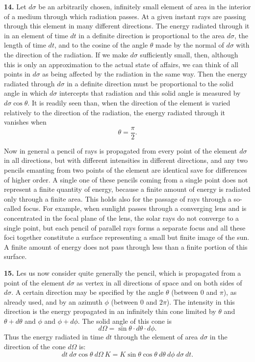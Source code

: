\documentclass[12pt,oneside]{book}
\begin{document}
\textbf{14.} Let $d\sigma$ be an arbitrarily chosen, infinitely small element of area in the interior of a medium through which radiation passes. At a given instant rays are passing through this element in many different directions. The energy radiated through it in an element of time $dt$ in a definite direction is proportional to the area $d\sigma$, the length of time $dt$, and to the cosine of the angle $\theta$ made by the normal of $d\sigma$ with the direction of the radiation. If we make $d\sigma$ sufficiently small, then, although this is only an approximation to the actual state of affairs, we can think of all points in $d\sigma$ as being affected by the radiation in the same way. Then the energy radiated through $d\sigma$ in a definite direction must be proportional to the solid angle in which $d\sigma$ intercepts that radiation and this solid angle is measured by $d\sigma \cos \theta$. It is readily seen than, when the direction of the element is varied relatively to the direction of the radiation, the energy radiated through it vanishes when 
$$\theta=\frac{\pi}{2}.$$ \par 

Now in general a pencil of rays is propagated from every point of the element $d\sigma$ in all directions, but with different intensities in different directions, and any two pencils emanting from two points of the element are identical save for differences of higher order. A single one of these pencils coming from a single point does not represent a finite quantity of energy, because a finite amount of energy is radiated only through a finite area. This holds also for the passage of rays through a so-called focus. For example, when sunlight passes through a converging lens and is concentrated in the focal plane of the lens, the solar rays do not converge to a single point, but each pencil of parallel rays forms a separate focus and all these foci together constitute a surface representing a small but finite image of the sun. A finite amount of energy does not pass through less than a finite portion of this surface. \par 

\textbf{15.} Les us now consider quite generally the pencil, which is propagated from a point of the element $d\sigma$ as vertex in all directions of space and on both sides of $d\sigma$. A certain direction may be specified by the angle $\theta$ (between 0 and $\pi$), as already used, and by an azimuth $\phi$ (between 0 and $2\pi$). The intensity in this direction is the energy propagated in an infinitely thin cone limited by $\theta$ and $\theta+d\theta$ and $\phi$ and $\phi+d\phi$. The solid angle of this cone is 
\begin{equation}
    \label{eq5}
    d\Omega=\sin\theta\cdot d\theta\cdot d\phi.
\end{equation}
Thus the energy radiated in time $dt$ through the element of area $d\sigma$ in the direction of the cone $d\Omega$ is:
\begin{equation}
    \label{eq6}
    dt\ d\sigma \cos\theta\ d\Omega\ K=K\sin\theta\cos\theta\ d\theta\ d\phi\ d\sigma\ dt.
\end{equation} \par 
\end{document}
